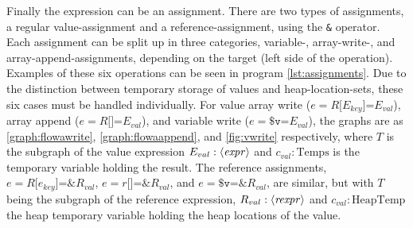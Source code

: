 Finally the expression can be an assignment. There are two types of assignments, a regular value-assignment and a reference-assignment, using the \texttt{\&} operator. Each assignment can be split up in three categories, variable-, array-write-, and array-append-assignments, depending on the target (left side of the operation). Examples of these six operations can be seen in program \ref{lst:assignments}. Due to the distinction between temporary storage of values and heap-location-sets, these six cases must be handled individually. For value array write ($e = R\texttt{[$E_{key}$]=} E_{val}$), array append ($e = R\texttt{[]=} E_{val}$), and variable write ($e = \texttt{\$v=} E_{val}$), the graphs are as \ref{graph:flowawrite}, \ref{graph:flowaappend}, and \ref{fig:vwrite} respectively, where $T$ is the subgraph of the value expression $E_{val} : \langle\mathit{expr}\rangle$ and $c_{val} : \text{Temps}$ is the temporary variable holding the result. The reference assignments,  $e = R\texttt{[$e_{key}$]=\&} R_{val}$, $e = r\texttt{[]=\&} R_{val}$, and $e = \texttt{\$v=\&} R_{val}$, are similar, but with $T$ being the subgraph of the reference expression, $R_{val} : \langle\mathit{rexpr}\rangle$ and $c_{val} : \text{HeapTemp}$ the heap temporary variable holding the heap locations of the value.
